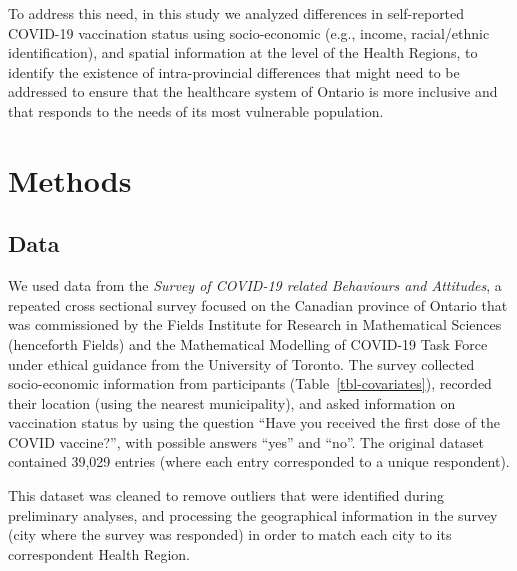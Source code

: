 \documentclass[
  letterpaper,
  DIV=11,
  numbers=noendperiod]{scrartcl}
\begin{document}
To address this need, in this study we analyzed differences in
self-reported COVID-19 vaccination status using socio-economic (e.g.,
income, racial/ethnic identification), and spatial information at the
level of the Health Regions, to identify the existence of
intra-provincial differences that might need to be addressed to ensure
that the healthcare system of Ontario is more inclusive and that
responds to the needs of its most vulnerable population.

\hypertarget{methods}{%
\section{Methods}\label{methods}}

\hypertarget{sec-data}{%
\subsection{Data}\label{sec-data}}

We used data from the \emph{Survey of COVID-19 related Behaviours and
Attitudes}, a repeated cross sectional survey focused on the Canadian
province of Ontario that was commissioned by the Fields Institute for
Research in Mathematical Sciences (henceforth Fields) and the
Mathematical Modelling of COVID-19 Task Force under ethical guidance
from the University of Toronto. The survey collected socio-economic
information from participants (Table~\ref{tbl-covariates}), recorded
their location (using the nearest municipality), and asked information
on vaccination status by using the question ``Have you received the
first dose of the COVID vaccine?'', with possible answers ``yes'' and
``no''. The original dataset contained 39,029 entries (where each entry
corresponded to a unique respondent).

This dataset was cleaned to remove outliers that were identified during
preliminary analyses, and processing the geographical information in the
survey (city where the survey was responded) in order to match each city
to its correspondent Health Region.
\end{document}
